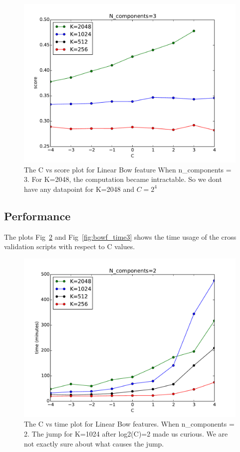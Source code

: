 \documentclass[final,leqno,onefignum,onetabnum]{siamltexmm}
\begin{document}
\begin{figure}
  \centering
  \includegraphics[width=0.60\linewidth]{images/score3Components}
  \caption{The C vs score plot for Linear Bow feature When n\_components = 3.  For K=2048, the computation became intractable.  So we dont have any datapoint for K=2048 and $C=2^{4}$\label{fig:bowf_score3}}
\end{figure}

\subsection{Performance}
The plots Fig~\ref{fig:bowf_time2} and Fig~\ref{fig:bowf_time3} shows the time usage of the cross validation scripts with respect to C values.
\begin{figure}
  \centering
  \includegraphics[width=0.60\linewidth]{images/time2Components}
  \caption{The C vs time plot for Linear Bow features. When n\_components = 2.  The jump for K=1024 after log2(C)=2 made us curious.  We are not exactly sure about what causes the jump.\label{fig:bowf_time2}}
\end{figure}
\end{document}
